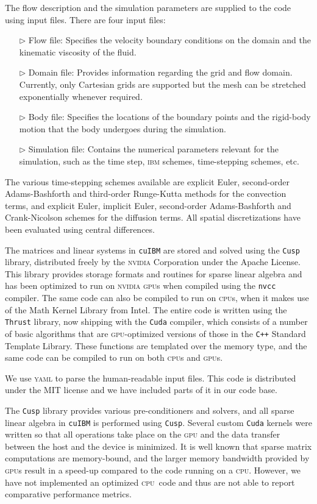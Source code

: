 \documentclass{tufte-handout}
\newcommand{\cuibm}{\Verb|cuIBM|\xspace}
\newcommand{\ibm}{\textsc{ibm}\xspace}
\newcommand{\gpu}{\textsc{gpu}}
\newcommand{\cpu}{\textsc{cpu}}
\newcommand{\nvidia}{\textsc{nvidia}\xspace}
\newcommand{\cuda}{\texttt{Cuda}\xspace}
\newcommand{\cusp}{\texttt{Cusp}\xspace}
\newcommand{\thrust}{\texttt{Thrust}\xspace}
\begin{document}
The flow description and the simulation parameters are supplied to the code using input files. There are four input files:
\begin{itemize}
\item[$\triangleright$] Flow file: Specifies the velocity boundary conditions on the domain and the kinematic viscosity of the fluid.
\item[$\triangleright$] Domain file: Provides information regarding the grid and flow domain. Currently, only Cartesian grids are supported but the mesh can be stretched exponentially whenever required.
\item[$\triangleright$] Body file: Specifies the locations of the boundary points and the rigid-body motion that the body undergoes during the simulation.
\item[$\triangleright$] Simulation file: Contains the numerical parameters relevant for the simulation, such as the time step, {\ibm} schemes, time-stepping schemes, etc.
\end{itemize}

The various time-stepping schemes available are explicit Euler, second-order Adams-Bashforth and third-order Runge-Kutta methods for the convection terms, and explicit Euler, implicit Euler, second-order Adams-Bashforth and Crank-Nicolson schemes for the diffusion terms. All spatial discretizations have been evaluated using central differences.

The matrices and linear systems in \cuibm are stored and solved using the {\cusp} library,\cite{Cusp}  distributed freely by the {\nvidia} Corporation under the Apache License. 
 This library provides storage formats and routines for sparse linear algebra and has been optimized to run on {\nvidia} {\gpu}s when compiled using the \texttt{nvcc} compiler. The same code can also be compiled to run on {\cpu}s, when it makes use of the Math Kernel Library from Intel. The entire code is written using the {\thrust} library, now shipping with the {\cuda} compiler, which consists of a number of basic algorithms that are {\gpu}-optimized versions of those in the \texttt{C++} Standard Template Library. These functions are templated over the memory type, and the same code can be compiled to run on both {\cpu}s and {\gpu}s.

We use \textsc{yaml}\cite{YAML2009} to parse the human-readable input files. This code is distributed under the MIT license and we have included parts of it in our code base.

The {\cusp} library provides various pre-conditioners and solvers, and all sparse linear algebra in \cuibm is performed using {\cusp}.  Several custom {\cuda} kernels were written so that all operations take place on the {\gpu} and the data transfer between the host and the device is minimized. It is well known that sparse matrix computations are memory-bound, and the larger memory bandwidth provided by {\gpu}s result in a speed-up compared to the code running on a {\cpu}. However, we have not implemented an optimized \cpu\ code and thus are not able to report comparative performance metrics.
\end{document}
